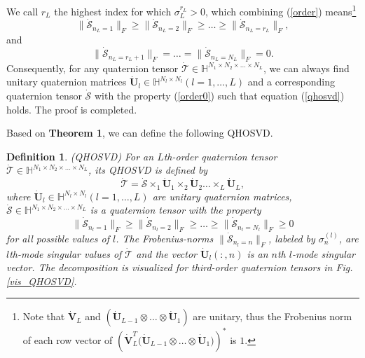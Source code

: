 \documentclass[journal]{IEEEtran}
\newtheorem{definition}{Definition}
\begin{document}
We call $r_{L}$ the highest index for which $\sigma_{L}^{r_{L}}>0$, which combining (\ref{order}) means\footnote{Note that $ \dot{\mathbf{V}}_{L}$ and  $(\dot{\mathbf{U}}_{L-1}\otimes\ldots\otimes\dot{\mathbf{U}}_{1})$ are unitary, thus the Frobenius norm of each row vector of $\left(\dot{\mathbf{V}}_{L}^{T} \big(\dot{\mathbf{U}}_{L-1}\otimes\ldots\otimes\dot{\mathbf{U}}_{1}\big)\right)^{\ast}$ is $1$.} 
\begin{equation}\label{order2}
\|\dot{\mathcal{S}}_{n_{L}=1}\|_{F}\geq\|\dot{\mathcal{S}}_{n_{L}=2}\|_{F}\geq\ldots\geq\|\dot{\mathcal{S}}_{n_{L}=r_{L}}\|_{F},
\end{equation}
and
\begin{equation}\label{order3}
\|\dot{\mathcal{S}}_{n_{L}=r_{L}+1}\|_{F}=\ldots=\|\dot{\mathcal{S}}_{n_{L}=N_{L}}\|_{F}=0.
\end{equation}
Consequently, for any quaternion tensor $\dot{\mathcal{T}}\in\mathbb{H}^{N_{1}\times N_{2} \times\ldots \times N_{L}}$, we can always find unitary quaternion matrices $\dot{\mathbf{U}}_{l}\in\mathbb{H}^{N_{l}\times N_{l}} (l=1,\ldots, L)$ and a corresponding quaternion tensor $\dot{\mathcal{S}}$ with the property (\ref{order0}) such that equation (\ref{qhosvd}) holds. 
The proof is completed.

Based on \textbf{Theorem 1}, we can define the following QHOSVD.
\begin{definition}(QHOSVD) For an $L$th-order quaternion tensor $\dot{\mathcal{T}}\in\mathbb{H}^{N_{1}\times N_{2} \times\ldots \times N_{L}}$, its QHOSVD is defined by
\begin{equation}
\label{qhosvd_d}
\dot{\mathcal{T}}=\dot{\mathcal{S}}\times_{1}\dot{\mathbf{U}}_{1}\times_{2}\dot{\mathbf{U}}_{2}\ldots\times_{L}\dot{\mathbf{U}}_{L},
\end{equation}	
where $\dot{\mathbf{U}}_{l}\in\mathbb{H}^{N_{l}\times N_{l}} (l=1,\ldots, L)$ are unitary quaternion matrices, $\dot{\mathcal{S}}\in\mathbb{H}^{N_{1}\times N_{2} \times\ldots \times N_{L}}$ is a quaternion tensor with the property
\begin{equation*}
\|\dot{\mathcal{S}}_{n_{l}=1}\|_{F}\geq\|\dot{\mathcal{S}}_{n_{l}=2}\|_{F}\geq\ldots\geq\|\dot{\mathcal{S}}_{n_{l}=N_{l}}\|_{F}\geq 0
\end{equation*}
for all possible values of $l$. The Frobenius-norms $\|\dot{\mathcal{S}}_{n_{l}=n}\|_{F}$,  labeled by $\sigma_{n}^{(l)}$, are $l$th-mode singular values of $\dot{\mathcal{T}}$ and the vector $\dot{\mathbf{U}}_{l}(:,n)$ is an $n$th $l$-mode singular vector. The decomposition is visualized for third-order quaternion tensors in Fig. \ref{vis_QHOSVD}.
\end{definition}
\end{document}
